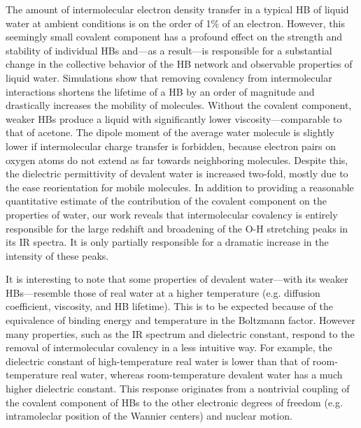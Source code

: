 \documentclass[aps,prl,reprint,amsmath,amssymb]{revtex4-1}
\begin{document}
The amount of intermolecular electron density transfer in a typical HB of liquid water at ambient conditions is on the order of 1\% of an electron. 
However, this seemingly small covalent component has a profound effect on the strength and stability of individual HBs and---as a result---is responsible for a substantial change in the collective behavior of the HB network and observable properties of liquid water. 
Simulations show that removing covalency from intermolecular interactions shortens the lifetime of a HB by an order of magnitude and drastically increases the mobility of molecules. 
Without the covalent component, weaker HBs produce a liquid with significantly lower viscosity---comparable to that of acetone. 
The dipole moment of the average water molecule is slightly lower if intermolecular charge transfer is forbidden, because electron pairs on oxygen atoms do not extend as far towards neighboring molecules. 
Despite this, the dielectric permittivity of devalent water is increased two-fold, mostly due to the ease reorientation for mobile molecules. 
In addition to providing a reasonable quantitative estimate of the contribution of the covalent component on the properties of water, our work reveals that intermolecular covalency is entirely responsible for the large redshift and broadening of the O-H stretching peaks in its IR spectra. It is only partially responsible for a dramatic increase in the intensity of these peaks. 

It is interesting to note that some properties of devalent water---with its weaker HBs---resemble those of real water at a higher temperature (e.g. diffusion coefficient, viscosity, and HB lifetime). 
This is to be expected because of the equivalence of binding energy and temperature in the Boltzmann factor. However many properties, such as the IR spectrum and dielectric constant, respond to the removal of intermolecular covalency in a less intuitive way. 
For example, the dielectric constant of high-temperature real water is lower than that of room-temperature real water, whereas room-temperature devalent water has a much higher dielectric constant. 
This response originates from a nontrivial coupling of the covalent component of HBs to the other electronic degrees of freedom (e.g. intramoleclar position of the Wannier centers) and nuclear motion.
\end{document}
